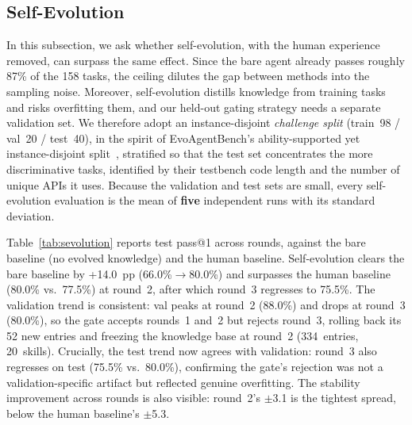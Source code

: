\documentclass[conference]{IEEEtran}
\begin{document}
\subsection{Self-Evolution}
\label{sec:exp_selfev}

In this subsection, we ask whether self-evolution, with the human experience removed, can surpass the same effect. Since the bare agent already passes roughly 87\% of the 158 tasks, the ceiling dilutes the gap between methods into the sampling noise. Moreover, self-evolution distills knowledge from training tasks and risks overfitting them, and our held-out gating strategy needs a separate validation set. We therefore adopt an instance-disjoint \emph{challenge split} (train~98 / val~20 / test~40), in the spirit of EvoAgentBench's ability-supported yet instance-disjoint split~\cite{gao2026evoagentbench}, stratified so that the test set concentrates the more discriminative tasks, identified by their testbench code length and the number of unique APIs it uses. Because the validation and test sets are small, every self-evolution evaluation is the mean of \textbf{five} independent runs with its standard deviation.

Table~\ref{tab:sevolution} reports test pass@1 across rounds, against the bare baseline (no evolved knowledge) and the human baseline. Self-evolution clears the bare baseline by +14.0~pp
(66.0\%$\to$80.0\%) and surpasses the human baseline (80.0\% vs.\ 77.5\%) at round~2, after which round~3 regresses to 75.5\%. The validation trend is consistent: val peaks at round~2 (88.0\%) and drops at round~3 (80.0\%), so the gate accepts rounds~1 and~2 but rejects round~3, rolling back its 52 new entries and freezing the knowledge base at round~2 (334~entries, 20~skills). Crucially, the test trend now agrees with validation: round~3 also regresses on test (75.5\% vs.\ 80.0\%), confirming the gate's rejection was not a validation-specific artifact but reflected genuine overfitting. The stability improvement across rounds is also visible: round~2's $\pm$3.1 is the tightest spread, below the human baseline's $\pm$5.3.
\end{document}
